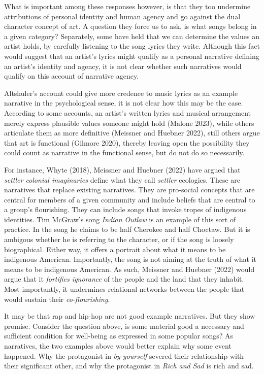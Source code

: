 \documentclass[
  letterpaper,
  DIV=11,
  numbers=noendperiod]{scrreprt}
\begin{document}
\begin{tcolorbox}[enhanced jigsaw, arc=.35mm, breakable, rightrule=.15mm, colback=white, colframe=quarto-callout-important-color-frame, bottomrule=.15mm, leftrule=.75mm, opacityback=0, toprule=.15mm, left=2mm]
\begin{tcolorbox}[enhanced jigsaw, arc=.35mm, breakable, rightrule=.15mm, colback=white, colframe=quarto-callout-tip-color-frame, bottomrule=.15mm, leftrule=.75mm, opacityback=0, toprule=.15mm, left=2mm]
What is important among these responses however, is that they too
undermine attributions of personal identity and human agency and go
against the dual character concept of art. A question they force us to
ask, is what songs belong in a given category? Separately, some have
held that we can determine the values an artist holds, by carefully
listening to the song lyrics they write. Although this fact would
suggest that an artist's lyrics might qualify as a personal narrative
defining an artist's identity and agency, it is not clear whether such
narratives would qualify on this account of narrative agency.

Altshuler's account could give more credence to music lyrics as an
example narrative in the psychological sense, it is not clear how this
may be the case. According to some accounts, an artist's written lyrics
and musical arrangement merely express plausible values someone might
hold (Malone 2023), while others articulate them as more definitive
(Meissner and Huebner 2022), still others argue that art is functional
(Gilmore 2020), thereby leaving open the possibility they could count as
narrative in the functional sense, but do not do so necessarily.

For instance, Whyte (2018), Meissner and Huebner (2022) have argued that
\emph{settler colonial imaginaries} define what they call \emph{settler}
ecologies. These are narratives that replace existing narratives. They
are pro-social concepts that are central for members of a given
community and include beliefs that are central to a group's flourishing.
They can include songs that invoke tropes of indigenous identities. Tim
McGraw's song \emph{Indian Outlaw} is an example of this sort of
practice. In the song he claims to be half Cherokee and half Choctaw.
But it is ambigous whether he is referring to the character, or if the
song is loosely biographical. Either way, it offers a portrait about
what it means to be indigenous American. Importantly, the song is not
aiming at the truth of what it means to be indigenous American. As such,
Meissner and Huebner (2022) would argue that it \emph{fortifies
ignorance} of the people and the land that they inhabit. Most
importantly, it undermines relational networks between the people that
would sustain their \emph{co-flourishing}.

It may be that rap and hip-hop are not good example narratives. But they
show promise. Consider the question above, is some material good a
necessary and sufficient condition for well-being as expressed in some
popular songs? As narratives, the two examples above would better
explain why some event happened. Why the protagonist in \emph{by
yourself} severed their relationship with their significant other, and
why the protagonist in \emph{Rich and Sad} is rich and sad.


\end{tcolorbox}
\end{tcolorbox}
\end{document}
